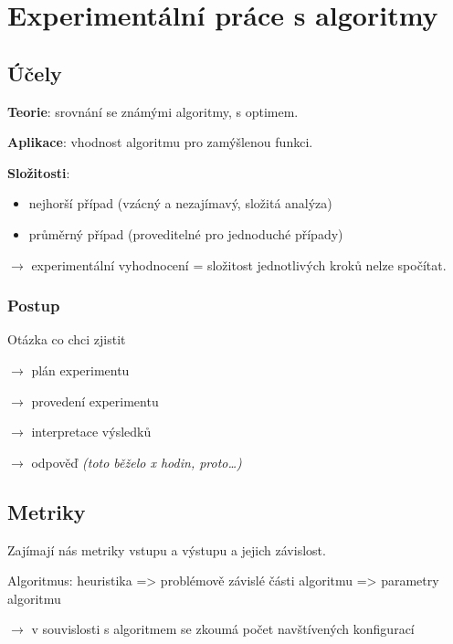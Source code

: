 \section{Experimentální práce s algoritmy}

\subsection{Účely}

\textbf{Teorie}: srovnání se známými algoritmy, s optimem.

\noindent \textbf{Aplikace}: vhodnost algoritmu pro zamýšlenou funkci.

\vspace{4pt}

\noindent \textbf{Složitosti}:

\begin{itemize}
    \item nejhorší případ (vzácný a nezajímavý, složitá analýza)
    \item průměrný případ (proveditelné pro jednoduché případy)
\end{itemize}

\noindent $\to$ experimentální vyhodnocení = složitost jednotlivých kroků nelze spočítat.

\vspace{4pt}

\subsubsection*{Postup}

Otázka co chci zjistit

$\to$ plán experimentu

$\to$ provedení experimentu

$\to$ interpretace výsledků

$\to$ odpověď \textit{(toto běželo x hodin, proto\ldots)}

\subsection{Metriky}

Zajímají nás metriky vstupu a výstupu a jejich závislost.

Algoritmus: heuristika => problémově závislé části algoritmu => parametry algoritmu

\noindent $\to$ v souvislosti s algoritmem se zkoumá počet navštívených konfigurací

\vspace{4pt}

